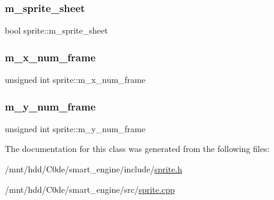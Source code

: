 \subsubsection{\texorpdfstring{m\+\_\+sprite\+\_\+sheet}{m\_sprite\_sheet}}
{\footnotesize\ttfamily bool sprite\+::m\+\_\+sprite\+\_\+sheet\hspace{0.3cm}{\ttfamily [private]}}

\mbox{\label{classsprite_a8d67c4d9227e4013248b17a702504660}} 
\subsubsection{\texorpdfstring{m\+\_\+x\+\_\+num\+\_\+frame}{m\_x\_num\_frame}}
{\footnotesize\ttfamily unsigned int sprite\+::m\+\_\+x\+\_\+num\+\_\+frame\hspace{0.3cm}{\ttfamily [private]}}

\mbox{\label{classsprite_a7322a7d73bc48184721ce0d239aaa586}} 
\subsubsection{\texorpdfstring{m\+\_\+y\+\_\+num\+\_\+frame}{m\_y\_num\_frame}}
{\footnotesize\ttfamily unsigned int sprite\+::m\+\_\+y\+\_\+num\+\_\+frame\hspace{0.3cm}{\ttfamily [private]}}



The documentation for this class was generated from the following files\+:\begin{DoxyCompactItemize}
\item 
/mnt/hdd/\+C0de/smart\+\_\+engine/include/\hyperlink{sprite_8h}{sprite.\+h}\item 
/mnt/hdd/\+C0de/smart\+\_\+engine/src/\hyperlink{sprite_8cpp}{sprite.\+cpp}\end{DoxyCompactItemize}
